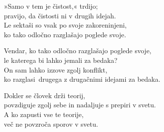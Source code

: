 
\clearpage

»Samo v tem je čistost,« trdijo;\\
pravijo, da čistosti ni v drugih idejah.\\
Le sektaši so vsak po svoje zakoreninjeni,\\
ko tako odločno razglašajo poglede svoje.

Vendar, ko tako odločno razglašajo poglede svoje,\\
le katerega bi lahko jemali za bedaka?\\
On sam lahko izzove zgolj konflikt,\\
ko razglasi drugega z drugačnimi idejami za bedaka.

Dokler se človek drži teorij,\\
povzdiguje zgolj sebe in nadaljuje s prepiri v svetu.\\
A ko zapusti vse te teorije,\\
več ne povzroča sporov v svetu.

